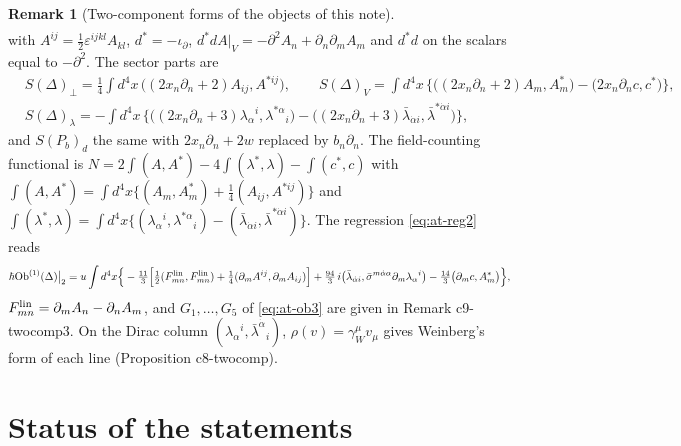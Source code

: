 \documentclass[11pt]{article}
\numberwithin{equation}{section}
\theoremstyle{plain}
\theoremstyle{definition}
\newtheorem{remark}[theorem]{Remark}
\newcommand{\AV}{A|_V}
\newcommand{\Ob}{\mathrm{Ob}}
\begin{document}
\begin{remark}[Two-component forms of the objects of this note]
\[\begin{aligned}
\end{aligned}
\]
with $A^{ij}=\tfrac12\varepsilon^{ijkl}A_{kl}$, $d^*=-\iota_\partial$, $d^*d\AV=-\partial^2A_n+\partial_n\partial_mA_m$ and $d^*d$ on the scalars equal to $-\partial^2$. The sector parts are
\[
\begin{aligned}
&S(\Delta)_\perp=\tfrac14\int d^4x\,\big((2x_n\partial_n+2)A_{ij},A^{*ij}\big),\qquad S(\Delta)_V=\int d^4x\,\Big\{\big((2x_n\partial_n+2)A_m,A^*_m\big)-\big(2x_n\partial_nc,c^*\big)\Big\},\\
&S(\Delta)_\lambda=-\int d^4x\,\Big\{\big((2x_n\partial_n+3)\lambda_\alpha{}^i,\lambda^{*\alpha}{}_i\big)-\big((2x_n\partial_n+3)\bar\lambda_{\dot\alpha i},\bar\lambda^{*\dot\alpha i}\big)\Big\},
\end{aligned}
\]
and $S(P_b)_d$ the same with $2x_n\partial_n+2w$ replaced by $b_n\partial_n$. The field-counting functional is $N=2\int(A,A^*)-4\int(\lambda^*,\lambda)-\int(c^*,c)$ with $\int(A,A^*)=\int d^4x\{(A_m,A^*_m)+\tfrac14(A_{ij},A^{*ij})\}$ and $\int(\lambda^*,\lambda)=\int d^4x\{(\lambda_\alpha{}^i,\lambda^{*\alpha}{}_i)-(\bar\lambda_{\dot\alpha i},\bar\lambda^{*\dot\alpha i})\}$. The regression \eqref{eq:at-reg2} reads
\[
\hbar\Ob^{(1)}(\Delta)\big|_2=u\int d^4x\Big\{-\tfrac{11}3\Big[\tfrac12(F^{\rm lin}_{mn},F^{\rm lin}_{mn})+\tfrac14(\partial_mA^{ij},\partial_mA_{ij})\Big]+\tfrac{94}3\,i\big(\bar\lambda_{\dot\alpha i},\bar\sigma^{m\dot\alpha\alpha}\partial_m\lambda_\alpha{}^i\big)-\tfrac{14}3\big(\partial_mc,A^*_m\big)\Big\},
\]
$F^{\rm lin}_{mn}=\partial_mA_n-\partial_nA_m$, and $G_1,\dots,G_5$ of \eqref{eq:at-ob3} are given in Remark c9-twocomp3. On the Dirac column $(\lambda_\alpha{}^i,\bar\lambda^{\dot\alpha}{}_i)$, $\rho(v)=\gamma_W^\mu v_\mu$ gives Weinberg's form of each line (Proposition c8-twocomp).
\end{remark}

\section{Status of the statements}
\label{sec:at-status}
\end{document}
